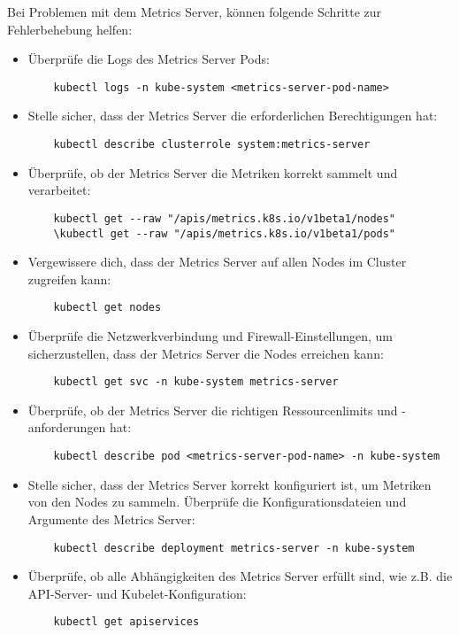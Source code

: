 \noindent
Bei Problemen mit dem Metrics Server, können folgende Schritte zur Fehlerbehebung helfen:

\begin{itemize}
    \item Überprüfe die Logs des Metrics Server Pods:
    \begin{verbatim}
    kubectl logs -n kube-system <metrics-server-pod-name>
    \end{verbatim}
    
    \item Stelle sicher, dass der Metrics Server die erforderlichen Berechtigungen hat:
    \begin{verbatim}
    kubectl describe clusterrole system:metrics-server
    \end{verbatim}
    
    \item Überprüfe, ob der Metrics Server die Metriken korrekt sammelt und verarbeitet:
    \begin{verbatim}
    kubectl get --raw "/apis/metrics.k8s.io/v1beta1/nodes"
    \kubectl get --raw "/apis/metrics.k8s.io/v1beta1/pods"
    \end{verbatim}

    \item Vergewissere dich, dass der Metrics Server auf allen Nodes im Cluster zugreifen kann:
    \begin{verbatim}
    kubectl get nodes
    \end{verbatim}

    \item Überprüfe die Netzwerkverbindung und Firewall-Einstellungen, um sicherzustellen, dass der Metrics Server die Nodes erreichen kann:
    \begin{verbatim}
    kubectl get svc -n kube-system metrics-server
    \end{verbatim}

    \item Überprüfe, ob der Metrics Server die richtigen Ressourcenlimits und -anforderungen hat:
    \begin{verbatim}
    kubectl describe pod <metrics-server-pod-name> -n kube-system
    \end{verbatim}
    
    \item Stelle sicher, dass der Metrics Server korrekt konfiguriert ist, um Metriken von den Nodes zu sammeln. Überprüfe die Konfigurationsdateien und Argumente des Metrics Server:
    \begin{verbatim}
    kubectl describe deployment metrics-server -n kube-system
    \end{verbatim}
    
    \item Überprüfe, ob alle Abhängigkeiten des Metrics Server erfüllt sind, wie z.B. die API-Server- und Kubelet-Konfiguration:
    \begin{verbatim}
    kubectl get apiservices
    \end{verbatim}
\end{itemize}